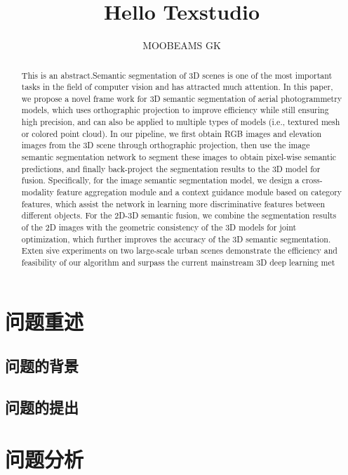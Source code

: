\documentclass[]{article}
\title{Hello Texstudio}
\author{MOOBEAMS GK}
\begin{document}
\maketitle

\begin{abstract}
This is an abstract.Semantic segmentation of 3D scenes is one of the
most important tasks in the field of computer vision and has
attracted much attention. In this paper, we propose a novel frame
work for 3D semantic segmentation of aerial photogrammetry
models, which uses orthographic projection to improve efficiency
while still ensuring high precision, and can also be applied to
multiple types of models (i.e., textured mesh or colored point
cloud). In our pipeline, we first obtain RGB images and elevation
images from the 3D scene through orthographic projection, then
use the image semantic segmentation network to segment these
images to obtain pixel-wise semantic predictions, and finally
back-project the segmentation results to the 3D model for
fusion. Specifically, for the image semantic segmentation model,
we design a cross-modality feature aggregation module and a
context guidance module based on category features, which assist
the network in learning more discriminative features between
different objects. For the 2D-3D semantic fusion, we combine
the segmentation results of the 2D images with the geometric
consistency of the 3D models for joint optimization, which further
improves the accuracy of the 3D semantic segmentation. Exten
sive experiments on two large-scale urban scenes demonstrate
the efficiency and feasibility of our algorithm and surpass the
current mainstream 3D deep learning met
\end{abstract}
\newpage
\tableofcontents
\newpage

\section{问题重述}

\subsection{问题的背景}

\subsection{问题的提出}

\section{问题分析}
\end{document}
